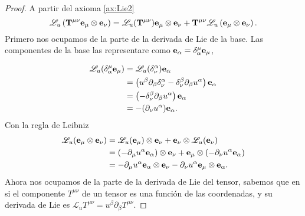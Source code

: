 \begin{proof}
    A partir del axioma \ref{ax:Lie2}
\begin{equation}
    \mathscr{L}_u \left( {\mathbf{T}}^{\mu \nu} \mathbf{e_\mu} \otimes \mathbf{e_\nu} \right) = \mathscr{L}_u({\mathbf{T}}^{\mu \nu}) \mathbf{e_\mu} \otimes \mathbf{e_\nu} + {\mathbf{T}}^{\mu \nu} \mathscr{L}_u \left( \mathbf{e_\mu} \otimes \mathbf{e_\nu} \right).
\end{equation}
Primero nos ocupamos de la parte de la derivada de Lie de la base.
Las componentes de la base las representare como $\mathbf{e_\alpha} = \delta^\mu_\alpha \mathbf{e_\mu} $,


\begin{equation}
    \begin{aligned}
        \mathscr{L}_u (\delta^\mu_\alpha \mathbf{e_\mu})& = \mathscr{L}_u (\delta^\alpha_\nu) \mathbf{e_\alpha} \\
        &= \left( u^\beta \partial_\beta \delta^\alpha_\nu - \delta^\beta_\nu \partial_\beta u^\alpha \right) \mathbf{e_\alpha} \\
        &= \left(  - \delta^\beta_\nu \partial_\beta u^\alpha \right) \mathbf{e_\alpha}                                         \\
        &   = - (\partial_\nu u^\alpha) \mathbf{e_\alpha}   .                                                                           \\
    \end{aligned}
\end{equation}
Con la regla de Leibniz
\begin{equation}
    \begin{aligned}
        \mathscr{L}_u (\mathbf{e_\mu} \otimes \mathbf{e_\nu}) & = \mathscr{L}_u (\mathbf{e_\mu}) \otimes  \mathbf{e_\nu} + \mathbf{e_\nu}\otimes\mathscr{L}_u (\mathbf{e_\nu})                                                     \\
                                                    & = \left( - \partial_\mu u^\alpha \mathbf{e_\alpha} \right) \otimes  \mathbf{e_\nu} + \mathbf{e_\mu}\otimes\left( - \partial_\nu u^\alpha \mathbf{e_\alpha} \right) \\
                                                    & = - \partial_\mu u^\alpha \mathbf{e_\alpha} \otimes  \mathbf{e_\nu} - \partial_\nu u^\alpha \mathbf{e_\mu}\otimes\mathbf{e_\alpha}      .                           \\
    \end{aligned}
\end{equation}
Ahora nos ocupamos de la parte de la derivada de Lie del tensor, sabemos que en si el componente $T^{\mu \nu}$ de un tensor es una función de las coordenadas, y su derivada de Lie es $\mathscr{L}_u T^{\mu \nu} = u^\beta \partial_\beta T^{\mu \nu} $.


\end{proof}

